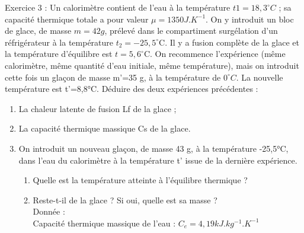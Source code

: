 \documentclass[12pt, french]{article}
\begin{document}

\begin{Box2}{Exercice 3 :}
Un calorimètre contient de l’eau à la température $t1 = 18,3^{\circ}C$ ; sa capacité thermique totale a pour valeur
$\mu=1350 J.K^{-1}$.
On y introduit un bloc de glace, de masse $m = 42 g$, prélevé dans le compartiment surgélation d’un
réfrigérateur à la température $t_2 = -25,5^{\circ}$C. Il y a fusion complète de la glace et la température d’équilibre
est $t = 5,6^{\circ}$C.
On recommence l’expérience (même calorimètre, même quantité d’eau initiale, même température), mais
on introduit cette fois un glaçon de masse m’=35 g, à la température de $0^{\circ}C$. La nouvelle température est
t’=8,8°C.
Déduire des deux expériences précédentes :
  \begin{enumerate}
    \item  La chaleur latente de fusion Lf de la glace ;
    \item La capacité thermique massique Cs de la glace.
    \item On introduit un nouveau glaçon, de masse 43 g, à la température -25,5°C, dans l’eau du calorimètre à la
température t’ issue de la dernière expérience.
      \begin{enumerate}
      \item Quelle est la température atteinte à l’équilibre thermique ?
\item Reste-t-il de la glace ? Si oui, quelle est sa masse ?
\\Donnée : \\Capacité thermique massique de l’eau : $C_e = 4,19 kJ.kg^{-1}.K^{-1}$
      \end{enumerate}
  \end{enumerate}
\end{Box2}




\end{document}
